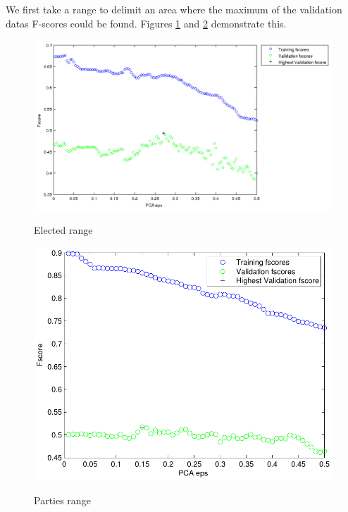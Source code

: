 \documentclass[a4paper,10pt]{article}
\begin{document}
We first take a range to delimit an area where the maximum of the validation datas F-scores could be found. Figures \ref{fig:elecRange} and \ref{fig:partiesRange} demonstrate this.

\begin{figure}
\begin{center}
	\caption{Elected range}
	{\includegraphics[scale=0.5,angle=0]{./img/lda_elec_range.pdf}}
	\label{fig:elecRange}
\end{center}
\end{figure}


\begin{figure}
\begin{center}
	\caption{Parties range}
	{\includegraphics[scale=0.5,angle=0]{./img/lda_party_range.pdf}}
	\label{fig:partiesRange}
\end{center}
\end{figure}
\end{document}
